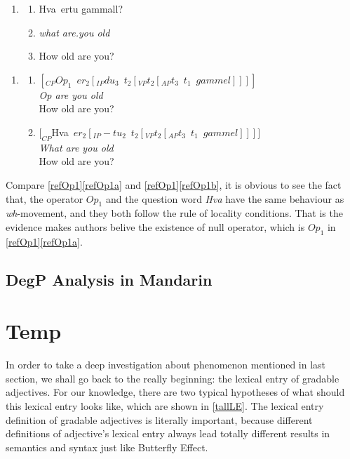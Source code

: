 \documentclass{ctexart}
\begin{document}
\begin{enumerate}[resume]
\item \label{refHva}
\begin{enumerate}
\item Hva\dh$\enspace$ertu gammall? 
\item \textit{what are.you old}
\item How old are you?
\end{enumerate}
\end{enumerate}

\begin{enumerate}[resume]
\item \label{refOp1}
\begin{enumerate}
\item \label{refOp1a} $[_{CP}Op_1 \enspace er_2[_{IP} du_3 \enspace t_2 [_{VP} t_2[_{AP} t_3 \enspace t_1 \enspace gammel]]]]$ \\
\textit{Op are you old} \\
How old are you?
\item \label{refOp1b} $[_{CP}$Hva\dh$\enspace er_2[_{IP} -tu_2 \enspace t_2 [_{VP} t_2[_{AP} t_3 \enspace t_1 \enspace gammel]]]]$ \\
\textit{What are you old} \\
How old are you?
\end{enumerate}
\end{enumerate}

Compare \ref{refOp1}\ref{refOp1a} and \ref{refOp1}\ref{refOp1b}, it is obvious to see the fact that, the operator $Op_1$ and the question word \textit{Hva\dh} \enspace have the same behaviour as \textit{wh}-movement, and they both follow the rule of locality conditions. That is the evidence makes authors belive the existence of null operator, which is $Op_1$ in \ref{refOp1}\ref{refOp1a}.


\subsection{DegP Analysis in Mandarin}


\section{Temp}

In order to take a deep investigation about phenomenon mentioned in last section, we shall go back to the really beginning: the lexical entry of gradable adjectives. For our knowledge, there are two typical hypotheses of what should this lexical entry looks like, which are shown in \ref{tallLE}. The lexical entry definition of gradable adjectives is literally important, because different definitions of adjective's lexical entry always lead totally different results in semantics and syntax just like Butterfly Effect.
\end{document}
